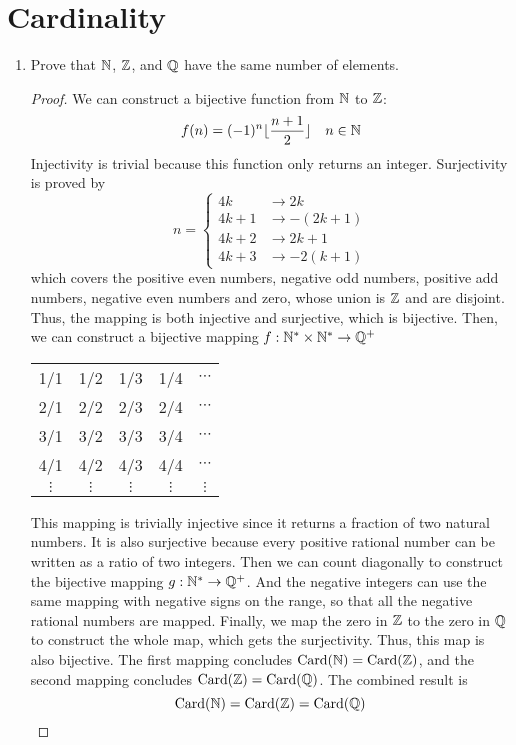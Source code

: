 \section{Cardinality}
\begin{enumerate}
	\item Prove that $\mathbb{N}$, $\mathbb{Z}$, and $\mathbb{Q}$ have the same number of elements.
	\begin{proof}
	We can construct a bijective function from $\mathbb{N}$ to $\mathbb{Z}$:
	\[f(n)=(-1)^n\lfloor \frac{n+1}{2}\rfloor\quad n\in\mathbb{N} \]
	Injectivity is trivial because this function only returns an integer.
	Surjectivity is proved by
	\[n=\begin{cases} 4k &\to 2k \\ 4k+1 &\to -(2k+1) \\ 4k+2 &\to 2k+1 \\ 4k+3 &\to -2(k+1) \end{cases} \]
	which covers the positive even numbers, negative odd numbers, positive add numbers, negative even numbers and zero, whose union is $\mathbb{Z}$ and are disjoint.
	Thus, the mapping is both injective and surjective, which is bijective.
	Then, we can construct a bijective mapping \(f:\mathbb{N}^*\times\mathbb{N}^*\to\mathbb{Q}^+\)
	\begin{center}
	\begin{tabular}{ccccc}
	1/1 & 1/2 & 1/3 & 1/4 & $\cdots$\\
	2/1 & 2/2 & 2/3 & 2/4 & $\cdots$\\
	3/1 & 3/2 & 3/3 & 3/4 & $\cdots$\\
	4/1 & 4/2 & 4/3 & 4/4 & $\cdots$\\
	$\vdots$ & $\vdots$ & $\vdots$ & $\vdots$ & $\vdots$
	\end{tabular}
	\end{center}
	This mapping is trivially injective since it returns a fraction of two natural numbers.
	It is also surjective because every positive rational number can be written as a ratio of two integers.
	Then we can count diagonally to construct the bijective mapping \(g:\mathbb{N}^*\to\mathbb{Q}^+\).
	And the negative integers can use the same mapping with negative signs on the range, so that all the negative rational numbers are mapped.
	Finally, we map the zero in $\mathbb{Z}$ to the zero in $\mathbb{Q}$ to construct the whole map, which gets the surjectivity.
	Thus, this map is also bijective.
	The first mapping concludes \(\mathrm{Card}(\mathbb{N})=\mathrm{Card}(\mathbb{Z})\), and the second mapping concludes \(\mathrm{Card}(\mathbb{Z})=\mathrm{Card}(\mathbb{Q})\).
	The combined result is
	\[\mathrm{Card}(\mathbb{N})=\mathrm{Card}(\mathbb{Z})=\mathrm{Card}(\mathbb{Q})\]

\end{proof}
\end{enumerate}
